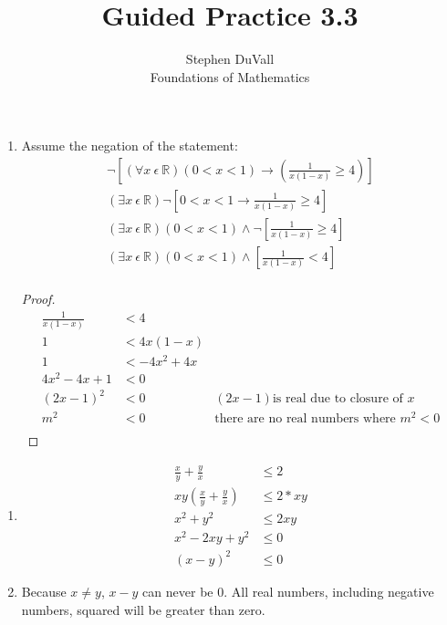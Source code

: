 \documentclass[12pt]{article}
\newenvironment{bgact}[2][Beginning Activity]{\begin{trivlist}
\item[\hskip \labelsep {\bfseries #1}\hskip \labelsep {\bfseries #2.}]}{\end{trivlist}}
\begin{document}
\title{Guided Practice 3.3}
\author{Stephen DuVall \\
Foundations of Mathematics}

\maketitle

\begin{bgact}{1}
	\hfill
	\begin{enumerate}
		\item[4.] Assume the negation of the statement:
		\begin{align*}
			\neg \left[(\forall x\ \epsilon\ \mathbb{R}) (0<x<1) \to \left(\frac{1}{x (1-x)}\geq 4\right)\right] \\
			(\exists x\ \epsilon\ \mathbb{R})\neg \left[0<x<1\to \frac{1}{x (1-x)}\geq 4\right] \\ 
			(\exists x\ \epsilon\ \mathbb{R})(0<x<1) \land \neg\left[\frac{1}{x (1-x)}\geq 4\right] \\
			(\exists x\ \epsilon\ \mathbb{R})(0<x<1) \land \left[\frac{1}{x (1-x)}<4\right] \\
		\end{align*}
		\begin{proof}
			\begin{align*}
				\frac{1}{x(1-x)} &< 4 \\
				1 &< 4x(1 - x) \\
				1 &< -4x^{2} + 4x \\
				4x^{2} - 4x + 1 &< 0 \\
				\left(2x - 1\right)^{2} &< 0 & (2x-1) \text{is real due to closure of } x \\
				m^{2} &< 0 & \text{there are no real numbers where } m^{2} < 0 \\
			\end{align*}
		\end{proof}
	\end{enumerate}
\end{bgact}

\begin{bgact}{2}
	\hfill
	\begin{enumerate}
		\item 
			\begin{align*}
				\frac{x}{y} + \frac{y}{x} &\le 	2 \\
				xy \left(\frac{x}{y} + \frac{y}{x} \right) &\le 2 * xy \\
				x^2 + y^2 &\le 2xy \\
				x^2 - 2xy + y^2 &\le 0 \\
				(x - y)^2 &\le 0
			\end{align*}
		\item Because $x \ne y$, $x - y$ can never be $0$. All real numbers, including negative numbers, squared will be greater than zero.
	\end{enumerate}
\end{bgact}
\end{document}
